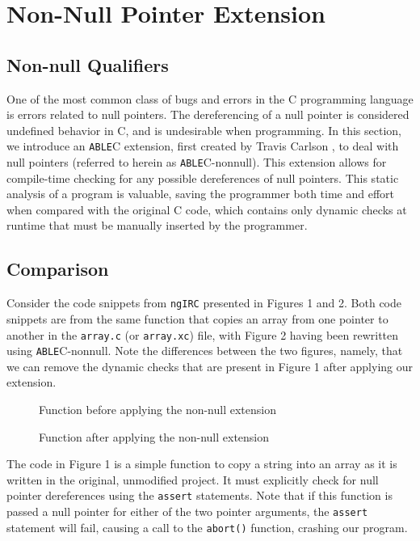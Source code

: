 \documentclass[main.tex]{subfiles}
\begin{document}
\section{Non-Null Pointer Extension}

\subsection{Non-null Qualifiers}
One of the most common class of bugs and errors in the C programming language is errors
related to null pointers. The dereferencing of a null pointer is considered
undefined behavior in C, and is undesirable when programming. In this section, we introduce an \verb|ABLE|C extension,
first created by Travis Carlson \cite{9}, to
deal with null pointers (referred to herein as \verb|ABLE|C-nonnull). This extension allows for compile-time
checking for any possible dereferences of null pointers. This static analysis of a program is valuable, saving
the programmer both time and effort when compared with the original C code, which contains only dynamic checks
at runtime that must be manually inserted by the programmer. 

\subsection{Comparison}

Consider the code snippets from \verb|ngIRC| presented in Figures 1 and 2. Both code snippets are from the same function that copies 
an array from one pointer to another in the \verb|array.c| (or \verb|array.xc|) file,
with Figure 2 having been rewritten using \verb|ABLE|C-nonnull. Note the differences between the two figures, namely, that we can
remove the dynamic checks that are present in Figure 1 after applying our extension.

\begin{figure}[h]

\caption{Function before applying the non-null extension}
\end{figure}
\begin{figure}[h]

\caption{Function after applying the non-null extension}
\end{figure}

The code in Figure 1 is a simple function to copy a string into an array as it is written in the original, unmodified project. It must explicitly
check for null pointer dereferences using the \verb|assert| statements. Note that if this function is passed a null pointer for either
of the two pointer arguments, the \verb|assert| statement will fail, causing a call to the \verb|abort()| function, crashing our
program.
\end{document}
